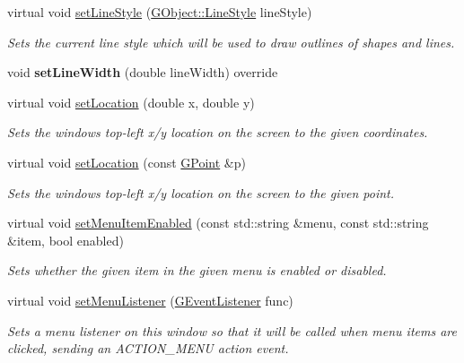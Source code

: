 \begin{DoxyCompactItemize}
virtual void \mbox{\hyperlink{classsgl_1_1GDrawingSurface_a6bfe14a77101db0fb97b5a7e07a5526b}{set\+Line\+Style}} (\mbox{\hyperlink{classsgl_1_1GObject_a86e0f5648542856159bb40775c854aa7}{G\+Object\+::\+Line\+Style}} line\+Style)
\begin{DoxyCompactList}\small\item\em Sets the current line style which will be used to draw outlines of shapes and lines. \end{DoxyCompactList}\item 
void {\bfseries set\+Line\+Width} (double line\+Width) override
\item 
virtual void \mbox{\hyperlink{classsgl_1_1GWindow_a04594e8ba9b98513a64f1da00dcae18c}{set\+Location}} (double x, double y)
\begin{DoxyCompactList}\small\item\em Sets the window\textquotesingle{}s top-\/left x/y location on the screen to the given coordinates. \end{DoxyCompactList}\item 
virtual void \mbox{\hyperlink{classsgl_1_1GWindow_a6ef8e1a904fffe55052f7a22f8552e4b}{set\+Location}} (const \mbox{\hyperlink{structsgl_1_1GPoint}{G\+Point}} \&p)
\begin{DoxyCompactList}\small\item\em Sets the window\textquotesingle{}s top-\/left x/y location on the screen to the given point. \end{DoxyCompactList}\item 
virtual void \mbox{\hyperlink{classsgl_1_1GWindow_a875124740630bebec069479fd3958efc}{set\+Menu\+Item\+Enabled}} (const std\+::string \&menu, const std\+::string \&item, bool enabled)
\begin{DoxyCompactList}\small\item\em Sets whether the given item in the given menu is enabled or disabled. \end{DoxyCompactList}\item 
virtual void \mbox{\hyperlink{classsgl_1_1GWindow_ab0002e0bf6566a5b98cc9128cb859b0e}{set\+Menu\+Listener}} (\mbox{\hyperlink{namespacesgl_ae9f3e9eab70035da1a2b114e21357b25}{G\+Event\+Listener}} func)
\begin{DoxyCompactList}\small\item\em Sets a menu listener on this window so that it will be called when menu items are clicked, sending an A\+C\+T\+I\+O\+N\+\_\+\+M\+E\+NU action event. \end{DoxyCompactList}\item 

\end{DoxyCompactItemize}
